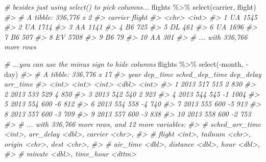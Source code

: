\documentclass[
]{book}
\newenvironment{Shaded}{\begin{snugshade}}{\end{snugshade}}
\newcommand{\CommentTok}[1]{\textcolor[rgb]{0.56,0.35,0.01}{\textit{#1}}}
\newcommand{\FunctionTok}[1]{\textcolor[rgb]{0.00,0.00,0.00}{#1}}
\newcommand{\NormalTok}[1]{#1}
\newcommand{\SpecialCharTok}[1]{\textcolor[rgb]{0.00,0.00,0.00}{#1}}
\begin{document}
\begin{Shaded}
\begin{Highlighting}[]
\CommentTok{\# besides just using select() to pick columns...}
\NormalTok{flights }\SpecialCharTok{\%\textgreater{}\%} \FunctionTok{select}\NormalTok{(carrier, flight)}
\CommentTok{\#\textgreater{} \# A tibble: 336,776 x 2}
\CommentTok{\#\textgreater{}    carrier flight}
\CommentTok{\#\textgreater{}    \textless{}chr\textgreater{}    \textless{}int\textgreater{}}
\CommentTok{\#\textgreater{}  1 UA        1545}
\CommentTok{\#\textgreater{}  2 UA        1714}
\CommentTok{\#\textgreater{}  3 AA        1141}
\CommentTok{\#\textgreater{}  4 B6         725}
\CommentTok{\#\textgreater{}  5 DL         461}
\CommentTok{\#\textgreater{}  6 UA        1696}
\CommentTok{\#\textgreater{}  7 B6         507}
\CommentTok{\#\textgreater{}  8 EV        5708}
\CommentTok{\#\textgreater{}  9 B6          79}
\CommentTok{\#\textgreater{} 10 AA         301}
\CommentTok{\#\textgreater{} \# ... with 336,766 more rows}

\CommentTok{\# ...you can use the minus sign to hide columns}
\NormalTok{flights }\SpecialCharTok{\%\textgreater{}\%} \FunctionTok{select}\NormalTok{(}\SpecialCharTok{{-}}\NormalTok{month, }\SpecialCharTok{{-}}\NormalTok{day)}
\CommentTok{\#\textgreater{} \# A tibble: 336,776 x 17}
\CommentTok{\#\textgreater{}     year dep\_time sched\_dep\_time dep\_delay arr\_time}
\CommentTok{\#\textgreater{}    \textless{}int\textgreater{}    \textless{}int\textgreater{}          \textless{}int\textgreater{}     \textless{}dbl\textgreater{}    \textless{}int\textgreater{}}
\CommentTok{\#\textgreater{}  1  2013      517            515         2      830}
\CommentTok{\#\textgreater{}  2  2013      533            529         4      850}
\CommentTok{\#\textgreater{}  3  2013      542            540         2      923}
\CommentTok{\#\textgreater{}  4  2013      544            545        {-}1     1004}
\CommentTok{\#\textgreater{}  5  2013      554            600        {-}6      812}
\CommentTok{\#\textgreater{}  6  2013      554            558        {-}4      740}
\CommentTok{\#\textgreater{}  7  2013      555            600        {-}5      913}
\CommentTok{\#\textgreater{}  8  2013      557            600        {-}3      709}
\CommentTok{\#\textgreater{}  9  2013      557            600        {-}3      838}
\CommentTok{\#\textgreater{} 10  2013      558            600        {-}2      753}
\CommentTok{\#\textgreater{} \# ... with 336,766 more rows, and 12 more variables:}
\CommentTok{\#\textgreater{} \#   sched\_arr\_time \textless{}int\textgreater{}, arr\_delay \textless{}dbl\textgreater{}, carrier \textless{}chr\textgreater{},}
\CommentTok{\#\textgreater{} \#   flight \textless{}int\textgreater{}, tailnum \textless{}chr\textgreater{}, origin \textless{}chr\textgreater{}, dest \textless{}chr\textgreater{},}
\CommentTok{\#\textgreater{} \#   air\_time \textless{}dbl\textgreater{}, distance \textless{}dbl\textgreater{}, hour \textless{}dbl\textgreater{},}
\CommentTok{\#\textgreater{} \#   minute \textless{}dbl\textgreater{}, time\_hour \textless{}dttm\textgreater{}}
\end{Highlighting}
\end{Shaded}
\end{document}
